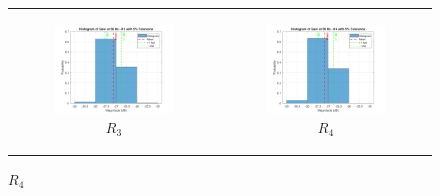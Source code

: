 \documentclass[hidelinks,12pt]{article}
\begin{document}
\begin{figure}[!h]
\begin{tabular}{cc}
			\begin{subfigure}[h]{0.45\textwidth}
				\centering
				\includegraphics[width=\textwidth]{figures/5_percent/r3.png}
				\caption{$R_3$}
			\end{subfigure} &
			\begin{subfigure}[h]{0.45\textwidth}
				\centering
				\includegraphics[width=\textwidth]{figures/5_percent/r4.png}
				\caption{$R_4$}
			\end{subfigure} \\[0.3cm]
			

\end{tabular}
\end{figure}
\end{document}
